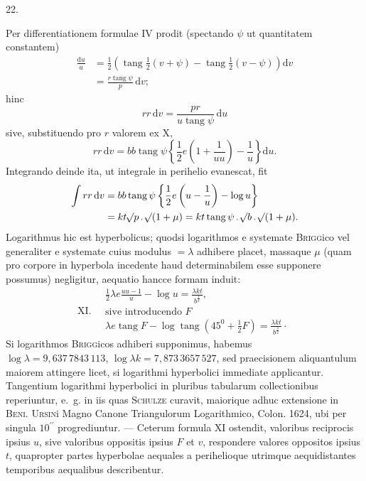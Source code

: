 \begin{center}
22.
\end{center}
Per differentiationem formulae IV prodit (spectando $\psi$ ut quantitatem constantem)
\[
\begin{aligned}
\frac{\mathrm{d}u}{u}&=\frac{1}{2}\left(\operatorname{tang}\frac{1}{2}(v+\psi)-\operatorname{tang}\frac{1}{2}(v-\psi)\right)\mathrm{d}v\\
&=\frac{r\operatorname{tang}\psi}{p}\,\mathrm{d}v;
\end{aligned}
\]
hinc
\[
r r\,\mathrm{d}v=\frac{p r}{u\operatorname{tang}\psi}\,\mathrm{d}u
\]
sive, substituendo pro $r$ valorem ex X,
\[
r r\,\mathrm{d}v=b b\operatorname{tang}\psi\left\{\frac{1}{2}e\left(1+\frac{1}{u u}\right)-\frac{1}{u}\right\}\mathrm{d}u.
\]
Integrando deinde ita, ut integrale in perihelio evanescat, fit
\[
\begin{aligned}
\int r r\,\mathrm{d}v&=b b\operatorname{tang}\psi\left\{\frac{1}{2}e\left(u-\frac{1}{u}\right)-\log u\right\}\\
&=k t\mathord{{}^{}\!\surd}p\, .\,\mathord{{}^{}\!\surd}(1+\mu)=k t\operatorname{tang}\psi\, .\,\mathord{{}^{}\!\surd}b\, .\,\mathord{{}^{}\!\surd}(1+\mu).
\end{aligned}
\]
Logarithmus hic est hyperbolicus; quodsi logarithmos e systemate \textsc{Brigg}ico vel generaliter e systemate cuius modulus $=\lambda$ adhibere placet, massaque $\mu$ (quam pro corpore in hyperbola incedente haud determinabilem esse supponere possumus) negligitur, aequatio hancce formam induit:
\[
\mathrm{XI.}\quad\begin{gathered}
\frac{1}{2}\lambda e\frac{u u-1}{u}-\log u=\frac{\lambda k t}{b^{\frac{3}{2}}},\\
\text{sive introducendo }F\\
\lambda e\operatorname{tang}F-\log\operatorname{tang}(45^0+\frac{1}{2}F)=\frac{\lambda k t}{b^{\frac{3}{2}}}\cdot
\end{gathered}
\]
Si logarithmos \textsc{Brigg}icos adhiberi supponimus, habemus \\
$\log\lambda=9{,}637\,7843\,113$, $\log\lambda k=7{,}873\,3657\,527$, sed praecisionem aliquantulum maiorem attingere licet, si logarithmi hyperbolici immediate applicantur. Tangentium logarithmi hyperbolici in pluribus tabularum collectionibus reperiuntur, e.\ g. in iis quas \textsc{Schulze} curavit, maiorique adhuc extensione in \textsc{Beni. Ursin}i Magno Canone Triangulorum Logarithmico, Colon. 1624, ubi per singula $10^{\prime\prime}$ progrediuntur. — Ceterum formula XI ostendit, valoribus reciprocis ipsius $u$, sive valoribus oppositis ipsius $F$ et $v$, respondere valores oppositos ipsius $t$, quapropter partes hyperbolae aequales a perihelioque utrimque aequidistantes temporibus aequalibus describentur.
